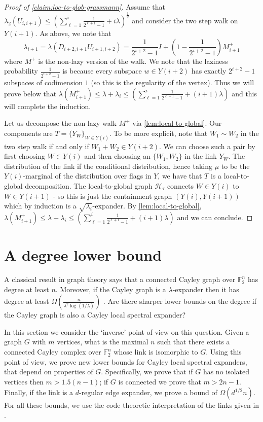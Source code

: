 \documentclass[10pt,a4paper]{article}
\newcommand{\prettyref}[1]{\cref{#1}}
\theoremstyle{definition}
\theoremstyle{remark}
\newcommand{\set}[1]{\{#1\}}
\newcommand{\F}{\mathbb{F}}
\renewcommand{\leq}{\leqslant}
\numberwithin{equation}{section}
\let\pref=\prettyref
\def\Y{Y}
\def\T{T}
\def\B{\mathcal{H}}
\begin{document}
\begin{proof}[Proof of \pref{claim:loc-to-glob-grassmann}]
    Assume that \(\lambda_2(U_{i,i+1}) \leq \left (\sum_{\ell=1}^i \frac{1}{2^{\ell+1}-1} + i \lambda \right )^{\frac{1}{2}}\) and consider the two step walk on \(\Y(i+1)\). As above, we note that
    \[\lambda_{i+1} = \lambda(D_{i+2,i+1}U_{i+1,i+2}) = \frac{1}{2^{i+2}-1} I + \left (1- \frac{1}{2^{i+2}-1} \right ) M_{i+1}^+\]
    where \(M^+\) is the non-lazy version of the walk. We note that the laziness probability \(\frac{1}{2^{i+2}-1}\) is because every subspace \(w \in \Y(i+2)\) has exactly \(2^{i+2}-1\) subspaces of codimension \(1\) (so this is the regularity of the vertex). Thus we will prove below that \(\lambda (M_{i+1}^+) \leq \lambda + \lambda_i \leq \left (\sum_{\ell=1}^i \frac{1}{2^{\ell+1}-1} + (i+1) \lambda \right )\) and this will complete the induction.
    
    Let us decompose the non-lazy walk \(M^+\) via \pref{lem:local-to-global}. Our components are \(\T = \set{\Y_W}_{W \in \Y(i)}\). To be more explicit, note that \(W_1 \sim W_2\) in the two step walk if and only if \(W_1+W_2 \in \Y(i+2)\). We can choose such a pair by first choosing \(W \in \Y(i)\) and then choosing an \(\set{W_1,W_2}\) in the link \(\Y_{W}\). The distribution of the link if the conditional distribution, hence taking \(\mu\) to be the \(\Y(i)\)-marginal of the distribution over flags in \(\Y\), we have that \(\T\) is a local-to-global decomposition. The local-to-global graph \(\B_\tau\) connects \(W \in \Y(i)\) to \(W \in \Y(i+1)\) - so this is just the containment graph \((\Y(i),\Y(i+1))\) which by induction is a \(\sqrt{\lambda_i}\)-expander. By \pref{lem:local-to-global},
    \(\lambda (M_{i+1}^+) \leq \lambda + \lambda_i \leq \left (\sum_{\ell=1}^i \frac{1}{2^{\ell+1}-1} + (i+1) \lambda \right )\) and we can conclude.
\end{proof}

\section{A degree lower bound} \label{app:degree-lower-bound}
    A classical result in graph theory says that a connected Cayley graph over \(\F_2^n\) has degree at least \(n\). Moreover, if the Cayley graph is a \(\lambda\)-expander then it has degree at least \(\Omega(\frac{n}{\lambda^2 \log(1/\lambda)})\) \cite{alon1992simple}. Are there sharper lower bounds on the degree if the Cayley graph is also a Cayley local spectral expander?
    
    In this section we consider the `inverse' point of view on this question. Given a graph \(G\) with \(m\) vertices, what is the maximal \(n\) such that there exists a connected Cayley complex over $\F_2^n$ whose link is isomorphic to \(G\). Using this point of view, we prove new lower bounds for Cayley local spectral expanders, that depend on properties of \(G\). Specifically, we prove that if \(G\) has no isolated vertices then \(m > 1.5 (n-1)\); if \(G\) is connected we prove that \(m > 2n-1\). Finally, if the link is a \(d\)-regular edge expander, we prove a bound of \(\Omega(d^{1/2} n)\). For all these bounds, we use the code theoretic interpretation of the links given in \cite{Golowich2023}.
    
\end{document}
